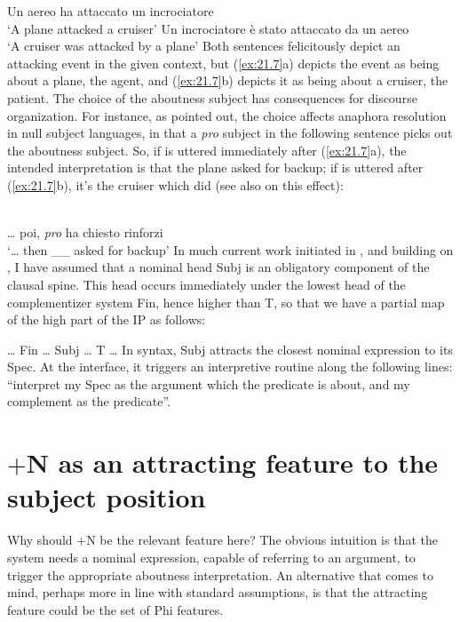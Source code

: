 \documentclass[output=paper]{langsci/langscibook}
\begin{document}
\begin{exe}
\ea%
\label{ex:21.7}
    \ea Un aereo ha attaccato un incrociatore\\
         ‘A plane   attacked      a cruiser’
    \ex Un incrociatore è stato attaccato  da un aereo\\
         ‘A cruiser          was attacked       by a plane’
    \z
\z
%
Both sentences felicitously depict an attacking event in the given context, but
(\ref{ex:21.7}a) depicts the event as being about a plane, the agent, and
(\ref{ex:21.7}b) depicts it as being about a cruiser, the patient. The
choice of the aboutness subject has consequences for discourse organization.
For instance, as \citet{Calabrese1986} pointed out, the choice affects anaphora
resolution in null subject languages, in that a \emph{pro} subject in the
following sentence picks out the aboutness subject. So, if  is
uttered immediately after (\ref{ex:21.7}a), the intended interpretation is
that the plane asked for backup; if  is uttered after
(\ref{ex:21.7}b), it’s the cruiser which did (see also
\citealt{BellettiEtAl2007} on this effect):

\ea%
    \label{ex:21.8}\\
    \dots{} poi, \emph{pro} ha chiesto rinforzi\\
    ‘\dots{} then \_\_ asked for backup’
\z
%
In much current work initiated in \citealt{rizzicriterial}, and building on
\citealt{Cardinaletti:2004a}, I have assumed that a nominal head Subj is an
obligatory component of the clausal spine. This head occurs immediately under
the lowest head of the complementizer system Fin, hence higher than T, so that
we have a partial map of the high part of the IP as follows:

\ea%
    \label{ex:21.9}
    \dots{} Fin \dots{} Subj\tss{[$+$N]} \dots{} T \dots{}
\z
%
In syntax, Subj\tss{[$+$N]} attracts the closest nominal expression to its Spec.
At the interface, it triggers an interpretive routine along the following
lines: “interpret my Spec as the argument which the predicate is about, and my
complement as the predicate”.

\section{$+$N as an attracting feature to the subject position}

Why should $+$N be the relevant feature here? The obvious intuition is that the
system needs a nominal expression, capable of referring to an argument, to
trigger the appropriate aboutness interpretation. An alternative that comes to
mind, perhaps more in line with standard assumptions, is that the attracting
feature could be the set of Phi features.


\end{exe}
\end{document}
